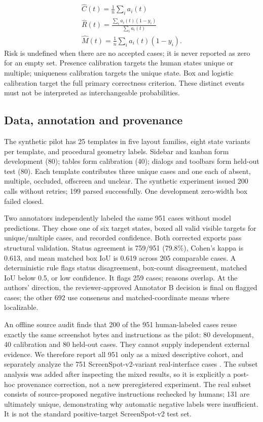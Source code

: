 \documentclass[10pt]{article}
\begin{document}
\begin{equation}
\begin{gathered}\widehat C(t)=\frac{1}{n}\sum_i a_i(t)\\[3pt]\widehat R(t)=\frac{\sum_i a_i(t)(1-y_i)}{\sum_i a_i(t)}\\[3pt]\widehat M(t)=\frac{1}{n}\sum_i a_i(t)(1-y_i).\end{gathered}
\label{eq:2}
\end{equation}
Risk is undefined when there are no accepted cases; it is never reported as zero for an empty set. Presence calibration targets the human states unique or multiple; uniqueness calibration targets the unique state. Box and logistic calibration target the full primary correctness criterion. These distinct events must not be interpreted as interchangeable probabilities.

\subsection*{Data, annotation and provenance}
The synthetic pilot has 25 templates in five layout families, eight state variants per template, and procedural geometry labels. Sidebar and kanban form development (80); tables form calibration (40); dialogs and toolbars form held-out test (80). Each template contributes three unique cases and one each of absent, multiple, occluded, offscreen and unclear. The synthetic experiment issued 200 calls without retries; 199 parsed successfully. One development zero-width box failed closed.

Two annotators independently labeled the same 951 cases without model predictions. They chose one of six target states, boxed all valid visible targets for unique/multiple cases, and recorded confidence. Both corrected exports pass structural validation. Status agreement is 759/951 (79.8\%), Cohen's kappa is 0.613, and mean matched box IoU is 0.619 across 205 comparable cases. A deterministic rule flags status disagreement, box-count disagreement, matched IoU below 0.5, or low confidence. It flags 259 cases; reasons overlap. At the authors' direction, the reviewer-approved Annotator B decision is final on flagged cases; the other 692 use consensus and matched-coordinate means where localizable.

An offline source audit finds that 200 of the 951 human-labeled cases reuse exactly the same screenshot bytes and instructions as the pilot: 80 development, 40 calibration and 80 held-out cases. They cannot supply independent external evidence. We therefore report all 951 only as a mixed descriptive cohort, and separately analyze the 751 ScreenSpot-v2-variant real-interface cases \citep{ref8}. The subset analysis was added after inspecting the mixed results, so it is explicitly a post-hoc provenance correction, not a new preregistered experiment. The real subset consists of source-proposed negative instructions rechecked by humans; 131 are ultimately unique, demonstrating why automatic negative labels were insufficient. It is not the standard positive-target ScreenSpot-v2 test set.
\end{document}
